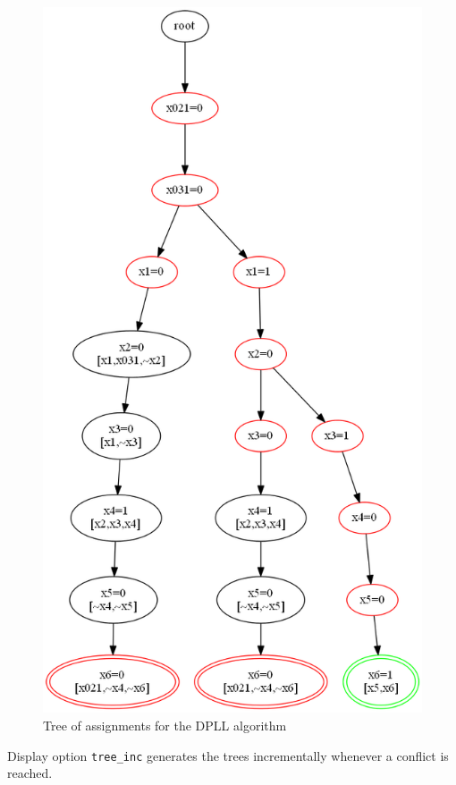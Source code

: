 \documentclass[11pt]{report}
\newcommand*{\p}[1]{\textup{\texttt{#1}}}
\begin{document}
\begin{figure}
\begin{center}
\includegraphics[keepaspectratio=true,height=.9\textheight]{tree1-color}
\end{center}
\caption{Tree of assignments for the DPLL algorithm}\label{tree1}
\end{figure}

Display option \p{tree\_inc} generates the trees incrementally whenever a conflict is reached.
\end{document}
